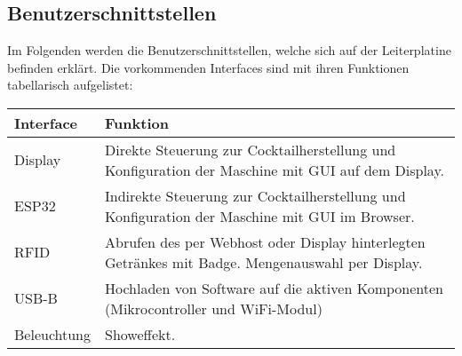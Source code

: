 \clearpage
\subsection{Benutzerschnittstellen}
\label{subsec:Benutzerschnittstellen}

Im Folgenden werden die Benutzerschnittstellen, welche sich auf der Leiterplatine befinden erklärt. Die vorkommenden Interfaces sind mit ihren Funktionen tabellarisch aufgelistet:

\begin{tabularx}{\textwidth}{|l|X|}
\hline
\textbf{Interface} & \textbf{Funktion}\\
\hline
Display & Direkte Steuerung zur Cocktailherstellung und Konfiguration der Maschine mit GUI auf dem Display. \\
\hline
ESP32 & Indirekte Steuerung zur Cocktailherstellung und Konfiguration der Maschine mit GUI im Browser.\\
\hline
RFID & Abrufen des per Webhost oder Display hinterlegten Getränkes mit Badge. Mengenauswahl per Display.\\
\hline
USB-B & Hochladen von Software auf die aktiven Komponenten (Mikrocontroller und WiFi-Modul)\\
\hline
Beleuchtung & Showeffekt.\\
\hline
\end{tabularx}